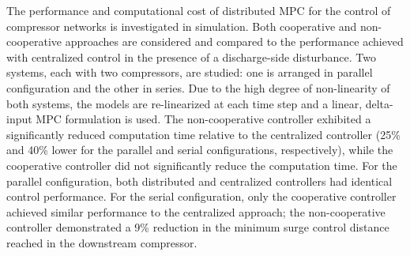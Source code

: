 The performance and computational cost of distributed MPC for the control of compressor networks is investigated in simulation.
Both cooperative and non-cooperative approaches are considered and compared to the performance achieved with centralized control in the presence of a discharge-side disturbance.
Two systems, each with two compressors, are studied: one is arranged in parallel configuration and the other in series.
Due to the high degree of non-linearity of both systems, the models are re-linearized at each time step and a linear, delta-input MPC formulation is used.
The non-cooperative controller exhibited a significantly reduced computation time relative to the centralized controller (25\% and 40\% lower for the parallel and serial configurations, respectively), while the cooperative controller did not significantly reduce the computation time.
For the parallel configuration, both distributed and centralized controllers had identical control performance.
For the serial configuration, only the cooperative controller achieved similar performance to the centralized approach; the non-cooperative controller demonstrated a 9\% reduction in the minimum surge control distance reached in the downstream compressor.
